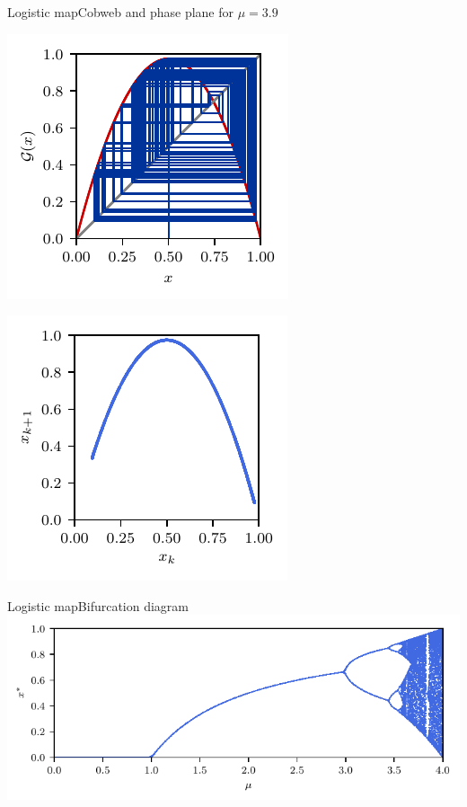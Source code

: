 \documentclass[usenames,dvipsnames,svgnames,10pt,aspectratio=169]{beamer}
\begin{document}
\begin{frame}[t, c]{Logistic map}{Cobweb and phase plane for $\mu = 3.9$}
	\begin{minipage}{.48\textwidth}
		\centering
		\includegraphics[width=.75\textwidth]{logistic_map_cobweb_plot_9}
	\end{minipage}%
	\begin{minipage}{.48\textwidth}
		\centering
		\includegraphics[width=.75\textwidth]{logistic_map_phase_plane_9}
	\end{minipage}

	\vspace{1cm}
\end{frame}

\begin{frame}[t, c]{Logistic map}{Bifurcation diagram}
	\centering
	\includegraphics[width=.75\textwidth]{logistic_map_bifurcation_overview}

	\vspace{1cm}
\end{frame}
\end{document}
